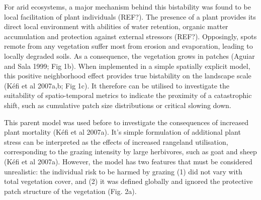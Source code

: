 For arid ecosystems, a major mechanism behind this bistability was found to be local facilitation of plant individuals (REF?). The presence of a plant provides its direct local environment with abilities of water retention, organic matter accumulation and protection against external stressors (REF?). Opposingly, spots remote from any vegetation suffer most from erosion and evaporation, leading to locally degraded soils. As a consequence, the vegetation grows in patches (Aguiar and Sala 1999; Fig 1b).  When implemented in a simple spatially explicit model, this positive neighborhood effect provides true bistability on the landscape scale (K\'efi et al 2007a,b; Fig 1c). It therefore can be utilised to investigate the suitability of spatio-temporal metrics to indicate the proximity of a catastrophic shift, such as cumulative patch size distributions or critical slowing down.  

This parent model was used before to investigate the consequences of increased plant mortality (K\'efi et al 2007a). It's simple formulation of additional plant stress can be interpreted as the effects of increased rangeland utilisation, corresponding to the grazing intensity by large herbivores, such as goat and sheep (K\'efi et al 2007a). However, the model has two features that must be considered unrealistic: the individual risk to be harmed by grazing (1) did not vary with total vegetation cover, and (2) it was defined globally and ignored the protective patch structure of the vegetation (Fig. 2a).


